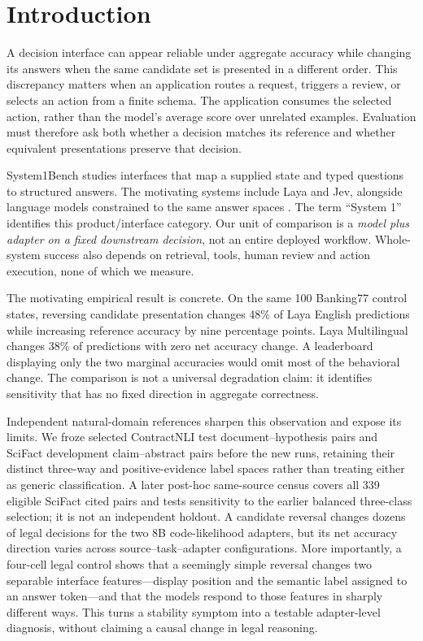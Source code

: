 \section{Introduction}
A decision interface can appear reliable under aggregate accuracy while changing its answers when the same candidate set is presented in a different order. This discrepancy matters when an application routes a request, triggers a review, or selects an action from a finite schema. The application consumes the selected action, rather than the model's average score over unrelated examples. Evaluation must therefore ask both whether a decision matches its reference and whether equivalent presentations preserve that decision.

System1Bench studies interfaces that map a supplied state and typed questions to structured answers. The motivating systems include Laya and Jev, alongside language models constrained to the same answer spaces \citep{layamodel,jevdocs}. The term ``System 1'' identifies this product/interface category. Our unit of comparison is a \emph{model plus adapter on a fixed downstream decision}, not an entire deployed workflow. Whole-system success also depends on retrieval, tools, human review and action execution, none of which we measure.

The motivating empirical result is concrete. On the same 100 Banking77 control states, reversing candidate presentation changes 48\% of Laya English predictions while increasing reference accuracy by nine percentage points. Laya Multilingual changes 38\% of predictions with zero net accuracy change. A leaderboard displaying only the two marginal accuracies would omit most of the behavioral change. The comparison is not a universal degradation claim: it identifies sensitivity that has no fixed direction in aggregate correctness.

Independent natural-domain references sharpen this observation and expose its limits. We froze selected ContractNLI test document--hypothesis pairs and SciFact development claim--abstract pairs before the new runs, retaining their distinct three-way and positive-evidence label spaces rather than treating either as generic classification. A later post-hoc same-source census covers all 339 eligible SciFact cited pairs and tests sensitivity to the earlier balanced three-class selection; it is not an independent holdout. A candidate reversal changes dozens of legal decisions for the two 8B code-likelihood adapters, but its net accuracy direction varies across source--task--adapter configurations. More importantly, a four-cell legal control shows that a seemingly simple reversal changes two separable interface features---display position and the semantic label assigned to an answer token---and that the models respond to those features in sharply different ways. This turns a stability symptom into a testable adapter-level diagnosis, without claiming a causal change in legal reasoning.

